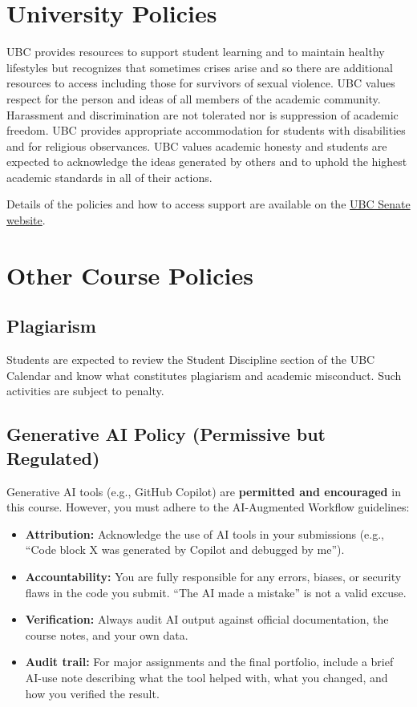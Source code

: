 \documentclass[
  letterpaper,
  DIV=11,
  numbers=noendperiod,
  oneside]{scrreprt}
\providecommand{\tightlist}{%
  \setlength{\itemsep}{0pt}\setlength{\parskip}{0pt}}
\begin{document}
\section{University Policies}\label{university-policies}

UBC provides resources to support student learning and to maintain
healthy lifestyles but recognizes that sometimes crises arise and so
there are additional resources to access including those for survivors
of sexual violence. UBC values respect for the person and ideas of all
members of the academic community. Harassment and discrimination are not
tolerated nor is suppression of academic freedom. UBC provides
appropriate accommodation for students with disabilities and for
religious observances. UBC values academic honesty and students are
expected to acknowledge the ideas generated by others and to uphold the
highest academic standards in all of their actions.

Details of the policies and how to access support are available on the
\href{https://senate.ubc.ca/}{UBC Senate website}.

\section{Other Course Policies}\label{other-course-policies}

\subsection{Plagiarism}\label{plagiarism}

Students are expected to review the Student Discipline section of the
UBC Calendar and know what constitutes plagiarism and academic
misconduct. Such activities are subject to penalty.

\subsection{Generative AI Policy (Permissive but
Regulated)}\label{generative-ai-policy-permissive-but-regulated}

Generative AI tools (e.g., GitHub Copilot) are \textbf{permitted and
encouraged} in this course. However, you must adhere to the AI-Augmented
Workflow guidelines:

\begin{itemize}
\tightlist
\item
  \textbf{Attribution:} Acknowledge the use of AI tools in your
  submissions (e.g., ``Code block X was generated by Copilot and
  debugged by me'').
\item
  \textbf{Accountability:} You are fully responsible for any errors,
  biases, or security flaws in the code you submit. ``The AI made a
  mistake'' is not a valid excuse.
\item
  \textbf{Verification:} Always audit AI output against official
  documentation, the course notes, and your own data.
\item
  \textbf{Audit trail:} For major assignments and the final portfolio,
  include a brief AI-use note describing what the tool helped with, what
  you changed, and how you verified the result.
\end{itemize}
\end{document}
